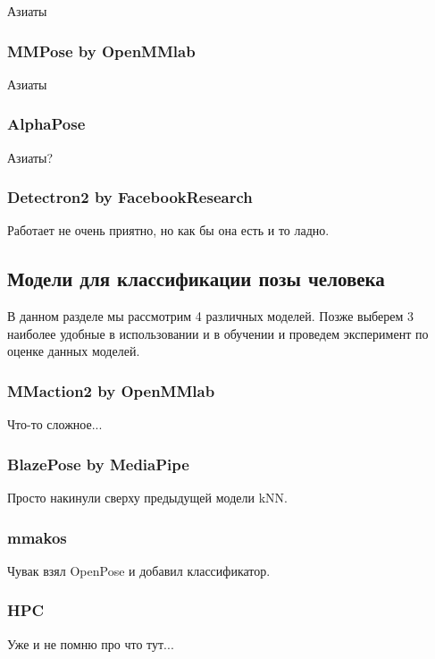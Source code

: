 Азиаты

\subsubsection{MMPose by OpenMMlab}

Азиаты

\subsubsection{AlphaPose}

Азиаты?

\subsubsection{Detectron2 by FacebookResearch}

Работает не очень приятно, но как бы она есть и то ладно.


\subsection{Модели для классификации позы человека}

В данном разделе мы рассмотрим 4 различных моделей. Позже выберем 3 наиболее удобные в использовании и в обучении и проведем эксперимент по оценке данных моделей.

\subsubsection{MMaction2 by OpenMMlab}

Что-то сложное...

\subsubsection{BlazePose by MediaPipe}

Просто накинули сверху предыдущей модели kNN.

\subsubsection{mmakos}

Чувак взял OpenPose и добавил классификатор.

\subsubsection{HPC}

Уже и не помню про что тут...

\newpage